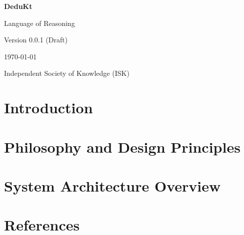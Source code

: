 \documentclass[11pt,oneside,a4paper]{book}
\theoremstyle{definition}
\theoremstyle{plain}
\theoremstyle{remark}
\begin{document}
    \begin{titlepage}
        \centering
        \vspace*{2cm}

        {\Huge\bfseries DeduKt \par}
        \vspace{1cm}
        {\Large Language of Reasoning \par}
        \vspace{2cm}

        {\Large Version 0.0.1 (Draft)\par}
        \vspace{0.5cm}
        {\large \today \par}

        \vfill

        {\Large Independent Society of Knowledge (ISK) \par}

    \end{titlepage}

    \tableofcontents
    \newpage
    
    \newpage
    
    \newpage
    
    \newpage
    
    \newpage
    
    \newpage
    
    \newpage
    

    \chapter{Introduction}\label{ch:introduction}
    
    
    
    
    
    

    \chapter{Philosophy and Design Principles}\label{ch:philosophy-and-design-principles}
    
    \chapter{System Architecture Overview}\label{ch:system-architecture-overview}
    


    \chapter{References}\label{ch:references}
    \printbibliography
\end{document}
